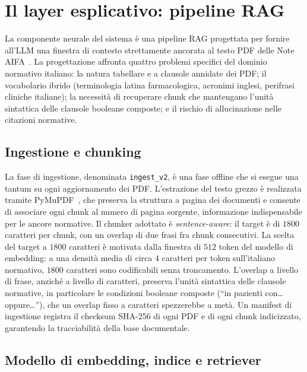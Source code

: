 \section{Il layer esplicativo: pipeline RAG}
\label{sec:layer-esplicativo}

La componente neurale del sistema è una pipeline RAG progettata per fornire
all'LLM una finestra di contesto strettamente ancorata al testo PDF delle
Note AIFA~\cite{lewis2020rag}.
La progettazione affronta quattro problemi specifici del dominio normativo
italiano: la natura tabellare e a clausole annidate dei PDF; il vocabolario
ibrido (terminologia latina farmacologica, acronimi inglesi, perifrasi
cliniche italiane); la necessità di recuperare chunk che mantengano l'unità
sintattica delle clausole booleane composte; e il rischio di allucinazione
nelle citazioni normative.

\subsection{Ingestione e chunking}
\label{subsec:ingestione}

La fase di ingestione, denominata \texttt{ingest\_v2}, è una fase offline
che si esegue una tantum su ogni aggiornamento dei PDF.
L'estrazione del testo grezzo è realizzata tramite PyMuPDF~\cite{pymupdf},
che preserva la struttura a pagina dei documenti e consente di associare
ogni chunk al numero di pagina sorgente, informazione indispensabile per
le ancore normative.
Il chunker adottato è \emph{sentence-aware}: il target è di $1800$ caratteri
per chunk, con un overlap di due frasi fra chunk consecutivi.
La scelta del target a $1800$ caratteri è motivata dalla finestra di $512$
token del modello di embedding: a una densità media di circa $4$ caratteri
per token sull'italiano normativo, $1800$ caratteri sono codificabili senza
troncamento.
L'overlap a livello di frase, anziché a livello di caratteri, preserva
l'unità sintattica delle clausole normative, in particolare le condizioni
booleane composte (``in pazienti con\ldots oppure\ldots''), che un overlap
fisso a caratteri spezzerebbe a metà.
Un manifest di ingestione registra il checksum SHA-256 di ogni PDF e di
ogni chunk indicizzato, garantendo la tracciabilità della base documentale.

\subsection{Modello di embedding, indice e retriever}
\label{subsec:embedding-retriever}

